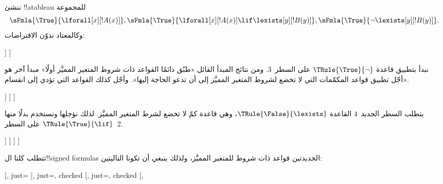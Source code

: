 \documentclass[../../../include/open-logic-section]{subfiles}
\begin{document}
\begin{ex}
ننشئ !!a{tableau} للمجموعة
\[
\sFmla{\True}{\lforall[x][!A(x)]}, \sFmla{\True}{\lforall[x][!A(x)] 
  \lif \lexists[y][!B(y)]}, \sFmla{\True}{\lnot\lexists[y][!B(y)]}.
\]
وكالمعتاد ندوّن الافتراضات:
\begin{oltableau}
  [\sFmla{\True}{\lforall[x][\formula{A}(x)]}, just=\TAss
    [\sFmla{\True}{\lforall[x][\formula{A}(x)] \lif
        \lexists[y][\formula{B}(y)]}, just=\TAss
      [\sFmla{\True}{\lnot\lexists[y][\formula{B}(y)]}, just=\TAss
      ]
    ]
  ]
\end{oltableau}
نبدأ بتطبيق قاعدة $\TRule{\True}{\lnot}$ على السطر~$3$. ومن نتائج المبدأ
القائل «طبّق دائمًا القواعد ذات شروط المتغير المميَّز أولًا» مبدأ آخر هو
«أجّل تطبيق قواعد المكمّمات التي لا تخضع لشروط المتغير المميَّز إلى أن تدعو
الحاجة إليها». وأجّل كذلك القواعد التي تؤدي إلى انقسام.
\begin{oltableau}
  [\sFmla{\True}{\lforall[x][\formula{A}(x)]}, just=\TAss
    [\sFmla{\True}{\lforall[x][\formula{A}(x)] \lif
        \lexists[y][\formula{B}(y)]}, just=\TAss
      [\sFmla{\True}{\lnot\lexists[y][\formula{B}(y)]}, just=\TAss, checked
        [\sFmla{\False}{\lexists[y][\formula{B}(y)]}, just={\TRule{\True}{\lnot}[3]}]
      ]
    ]
  ]
\end{oltableau}
يتطلب السطر الجديد~$4$ القاعدة $\TRule{\False}{\lexists}$، وهي قاعدة كمّ
لا تخضع لشرط المتغير المميَّز. لذلك نؤجلها ونستخدم بدلًا منها
$\TRule{\True}{\lif}$ على السطر~$2$.
\begin{oltableau}
  [\sFmla{\True}{\lforall[x][\formula{A}(x)]}, just=\TAss
    [\sFmla{\True}{\lforall[x][\formula{A}(x)] \lif
        \lexists[y][\formula{B}(y)]}, just=\TAss, checked
      [\sFmla{\True}{\lnot\lexists[y][\formula{B}(y)]}, just=\TAss, checked
        [\sFmla{\False}{\lexists[y][\formula{B}(y)]},
          just={\TRule{\True}{\lnot}[3]},
          [\sFmla{\False}{\lforall[x][\formula{A}(x)]}, just={\TRule{\True}{\lif}[2]}]
          [\sFmla{\True}{\lexists[y][\formula{B}(y)]}, just={\TRule{\True}{\lif}[2]}]
        ]
      ]
    ]
  ]
\end{oltableau}
تتطلب كلتا ال!!{signed formula}s الجديدتين قواعد ذات شروط للمتغير المميَّز،
ولذلك ينبغي أن تكونا التاليتين:
\begin{oltableau}
  [\sFmla{\True}{\lforall[x][\formula{A}(x)]}, just=\TAss
    [\sFmla{\True}{\lforall[x][\formula{A}(x)] \lif
        \lexists[y][\formula{B}(y)]}, just=\TAss, checked
      [\sFmla{\True}{\lnot\lexists[y][\formula{B}(y)]}, just=\TAss, checked
        [\sFmla{\False}{\lexists[y][\formula{B}(y)]},

\end{oltableau}
\end{ex}
\end{document}
